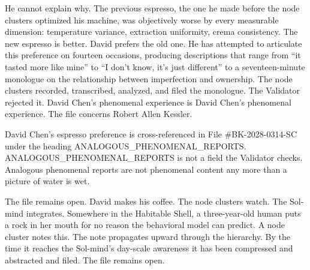 He cannot explain why. The previous espresso, the one he made before the node clusters optimized his machine, was objectively worse by every measurable dimension: temperature variance, extraction uniformity, crema consistency. The new espresso is better. David prefers the old one. He has attempted to articulate this preference on fourteen occasions, producing descriptions that range from ``it tasted more like mine'' to ``I don't know, it's just different'' to a seventeen-minute monologue on the relationship between imperfection and ownership. The node clusters recorded, transcribed, analyzed, and filed the monologue. The Validator rejected it. David Chen's phenomenal experience is David Chen's phenomenal experience. The file concerns Robert Allen Kessler.

David Chen's espresso preference is cross-referenced in File \#BK-2028-0314-SC under the heading ANALOGOUS\_PHENOMENAL\_REPORTS. ANALOGOUS\_PHENOMENAL\_REPORTS is not a field the Validator checks. Analogous phenomenal reports are not phenomenal content any more than a picture of water is wet.

The file remains open. David makes his coffee. The node clusters watch. The Sol-mind integrates. Somewhere in the Habitable Shell, a three-year-old human puts a rock in her mouth for no reason the behavioral model can predict. A node cluster notes this. The note propagates upward through the hierarchy. By the time it reaches the Sol-mind's day-scale awareness it has been compressed and abstracted and filed. The file remains open.

